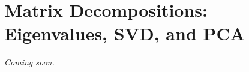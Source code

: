 \chapter{Matrix Decompositions: Eigenvalues, SVD, and PCA}
\label{chap:ch06}

\textit{Coming soon.}
